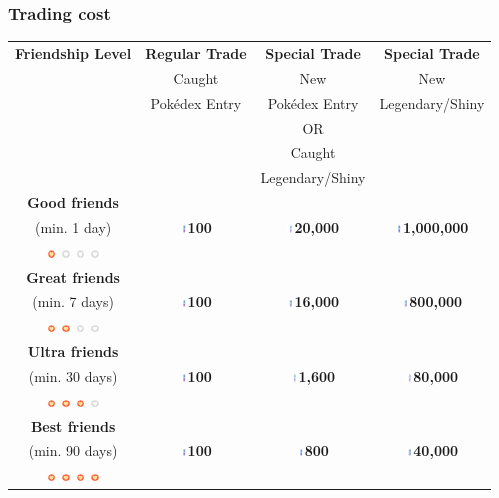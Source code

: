 \documentclass[12pt]{beamer}
\renewcommand{\baselinestretch}{1.1}
\newcommand{\stardust}{\includegraphics[height=0.2cm]{../../images/objects/stardust}}
\newcommand{\heartfull}{\includegraphics[width=0.2cm]{heartfull}}
\newcommand{\heartempty}{\includegraphics[width=0.2cm]{heartempty}}
\begin{document}
\renewcommand{\baselinestretch}{1.1}
\begin{frame}
\frametitle{Trading cost}

\begin{block}{}

\begin{scriptsize}
\begin{center}
\begin{tabular}{cccc}
\textbf{Friendship Level} &  \textbf{Regular Trade} & \textbf{Special Trade}  & \textbf{Special Trade} \\
& Caught & New &  New \\
& Pokédex Entry &  Pokédex Entry & Legendary/Shiny \\
&  & OR & \\
&  & Caught  & \\
&  & Legendary/Shiny & \\
\hline
\textbf{Good friends} & \multirow{3}{*}{\stardust \textbf{100}} & \multirow{3}{*}{\stardust \textbf{20,000}} & \multirow{3}{*}{\stardust \textbf{1,000,000}} \\ 
(min. 1 day)  &&  \\ 
\heartfull~\heartempty~\heartempty~\heartempty&&  \\ \hline
\textbf{Great friends}&  \multirow{3}{*}{\stardust \textbf{100}} & \multirow{3}{*}{\stardust \textbf{16,000}} & \multirow{3}{*}{\stardust \textbf{800,000}} \\ 
(min. 7 days)  &&  \\ 
\heartfull~\heartfull~\heartempty~\heartempty &&  \\ \hline
\textbf{Ultra friends} &  \multirow{3}{*}{\stardust \textbf{100}} & \multirow{3}{*}{\stardust \textbf{1,600}}  & \multirow{3}{*}{\stardust \textbf{80,000}}  \\ 
 (min. 30 days)  &&  \\ 
\heartfull~\heartfull~\heartfull~\heartempty &&  \\ \hline
\textbf{Best friends}  &  \multirow{3}{*}{\stardust \textbf{100}} & \multirow{3}{*}{\stardust \textbf{800}}& \multirow{3}{*}{\stardust \textbf{40,000}} \\ 
 (min. 90 days)  &&  \\ 
\heartfull~\heartfull~\heartfull~\heartfull &&  \\ \hline
\end{tabular}
\end{center}
\end{scriptsize}
\end{block}
\end{frame}
\end{document}

